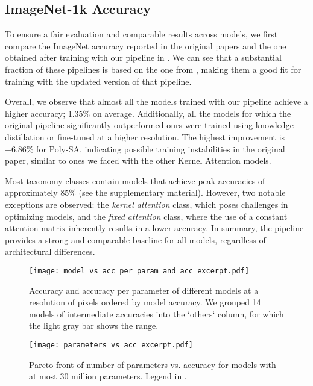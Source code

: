 \subsection{ImageNet-1k Accuracy}
To ensure a fair evaluation and comparable results across models, we first compare the ImageNet accuracy reported in the original papers and the one obtained after training with our pipeline in .
We can see that a substantial fraction of these pipelines is based on the one from \cite{Touvron2021b}, making them a good fit for training with the updated version of that pipeline.


Overall, we observe that almost all the models trained with our pipeline achieve a higher accuracy; 1.35\% on average.
Additionally, all the models for which the original pipeline significantly outperformed ours were trained using knowledge distillation or fine-tuned at a higher resolution. 
The highest improvement is +6.86\% for 
Poly-SA, indicating possible training instabilities in the original paper, similar to ones we faced with the other Kernel Attention models.

Most taxonomy classes contain models that achieve peak accuracies of approximately 85\% (see the supplementary material). However, two notable exceptions are observed: the \emph{kernel attention} class, which poses challenges in optimizing models, and the \emph{fixed attention} class, where the use of a constant attention matrix inherently results in a lower accuracy.
In summary, the pipeline provides a strong and comparable baseline for all models, regardless of architectural differences.

\begin{figure}
	\centering
	\texttt{[image: model\_vs\_acc\_per\_param\_and\_acc\_excerpt.pdf]}
	\caption{Accuracy and accuracy per parameter of different models at a resolution of  pixels ordered by model accuracy. We grouped 14 models of intermediate accuracies into the `others` column, for which the light gray bar  shows the range.}
	\label{fig:model_vs_acc_per_param_and_acc_excerpt}
\end{figure}
\begin{figure}[h]
	\centering
	\texttt{[image: parameters\_vs\_acc\_excerpt.pdf]}
	\caption{Pareto front of number of parameters vs. accuracy for models with at most 30 million parameters. Legend in .}
	\label{fig:parameters_vs_acc_excerpt}
\end{figure}

